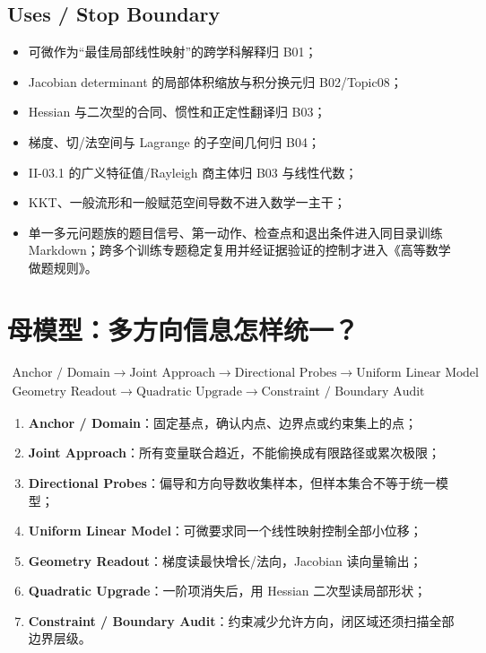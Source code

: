 \documentclass[11pt,a4paper,fontset=fandol]{ctexart}
\newcommand{\kw}[1]{\textbf{\color{deep}#1}}
\begin{document}
\subsection{Uses / Stop Boundary}
\begin{itemize}
  \item 可微作为“最佳局部线性映射”的跨学科解释归 B01；
  \item Jacobian determinant 的局部体积缩放与积分换元归 B02/Topic08；
  \item Hessian 与二次型的合同、惯性和正定性翻译归 B03；
  \item 梯度、切/法空间与 Lagrange 的子空间几何归 B04；
  \item II-03.1 的广义特征值/Rayleigh 商主体归 B03 与线性代数；
  \item KKT、一般流形和一般赋范空间导数不进入数学一主干；
  \item 单一多元问题族的题目信号、第一动作、检查点和退出条件进入同目录训练 Markdown；跨多个训练专题稳定复用并经证据验证的控制才进入《高等数学做题规则》。
\end{itemize}

\section{母模型：多方向信息怎样统一？}

\[
\boxed{\begin{gathered}
\text{Anchor / Domain}
\to\text{Joint Approach}
\to\text{Directional Probes}
\to\text{Uniform Linear Model}\\
\text{Geometry Readout}
\to\text{Quadratic Upgrade}
\to\text{Constraint / Boundary Audit}
\end{gathered}}
\]

\begin{enumerate}
  \item \kw{Anchor / Domain}：固定基点，确认内点、边界点或约束集上的点；
  \item \kw{Joint Approach}：所有变量联合趋近，不能偷换成有限路径或累次极限；
  \item \kw{Directional Probes}：偏导和方向导数收集样本，但样本集合不等于统一模型；
  \item \kw{Uniform Linear Model}：可微要求同一个线性映射控制全部小位移；
  \item \kw{Geometry Readout}：梯度读最快增长/法向，Jacobian 读向量输出；
  \item \kw{Quadratic Upgrade}：一阶项消失后，用 Hessian 二次型读局部形状；
  \item \kw{Constraint / Boundary Audit}：约束减少允许方向，闭区域还须扫描全部边界层级。
\end{enumerate}
\end{document}

